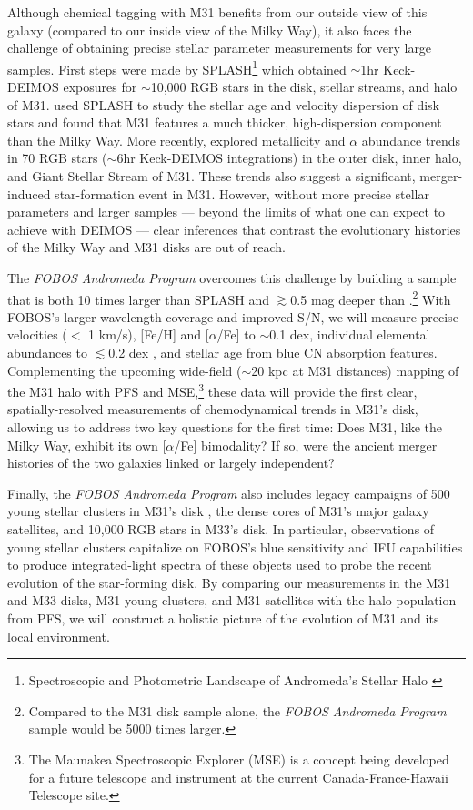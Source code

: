 \documentclass[11pt,a4paper,twoside,onecolumn,openany,final,oldfontcommands]{memoir}
\begin{document}
Although chemical tagging with M31 benefits from our outside view of this galaxy (compared to our inside view of the Milky Way), it also faces the challenge of obtaining precise stellar parameter measurements for very large samples.  First steps were made by SPLASH\footnote{Spectroscopic and Photometric Landscape of Andromeda’s Stellar Halo \citep[e.g.][]{splash}} which obtained $\sim$1hr Keck-DEIMOS exposures for $\sim$10,000 RGB stars in the disk, stellar streams, and halo of M31.  \citet{dorman15} used SPLASH to study the stellar age and velocity dispersion of disk stars and found that M31 features a much thicker, high-dispersion component than the Milky Way.  More recently, \citet{Escala20} explored metallicity and $\alpha$ abundance trends in 70 RGB stars ($\sim$6hr Keck-DEIMOS integrations) in the outer disk, inner halo, and Giant Stellar Stream of M31.  These trends also suggest a significant, merger-induced star-formation event in M31.  However, without more precise stellar parameters and larger samples --- beyond the limits of what one can expect to achieve with DEIMOS --- clear inferences that contrast the evolutionary histories of the Milky Way and M31 disks are out of reach.

The {\it FOBOS Andromeda Program} overcomes this challenge by building a sample that is both 10 times larger than SPLASH and $\gtrsim$0.5 mag deeper than \citet{Escala20}.\footnote{Compared to the \citet{Escala20} M31 disk sample alone, the {\it FOBOS Andromeda Program} sample would be 5000 times larger.}  With FOBOS's larger wavelength coverage and improved S/N, we will measure precise velocities ($<$ 1 km/s), [Fe/H] and [$\alpha$/Fe] to $\sim$0.1 dex, individual elemental abundances to $\lesssim$0.2 dex \citep[Fig.~\ref{fig:abundances_snr}; cf.][]{YST2017}, and stellar age from blue CN absorption features.  Complementing the upcoming wide-field ($\sim$20 kpc at M31 distances) mapping of the M31 halo with PFS and MSE,\footnote{The Maunakea Spectroscopic Explorer (MSE) is a concept being developed for a future telescope and instrument at the current Canada-France-Hawaii Telescope site.} these data will provide the first clear, spatially-resolved measurements of chemodynamical trends in M31's disk, allowing us to address two key questions for the first time: Does M31, like the Milky Way, exhibit its own [$\alpha$/Fe] bimodality?  If so, were the ancient merger histories of the two galaxies linked or largely independent?

Finally, the {\it FOBOS Andromeda Program} also includes legacy campaigns of 500 young stellar clusters in M31's disk \citep[dwarfing even Milky Way samples,][]{johnson15}, the dense cores of M31's major galaxy satellites, and 10,000 RGB stars in M33's disk.  In particular, observations of young stellar clusters capitalize on FOBOS's blue sensitivity and IFU capabilities to produce integrated-light spectra of these objects used to probe the recent evolution of the star-forming disk.  By comparing our measurements in the M31 and M33 disks, M31 young clusters, and M31 satellites with the halo population from PFS, we will construct a holistic picture of the evolution of M31 and its local environment.
\end{document}
